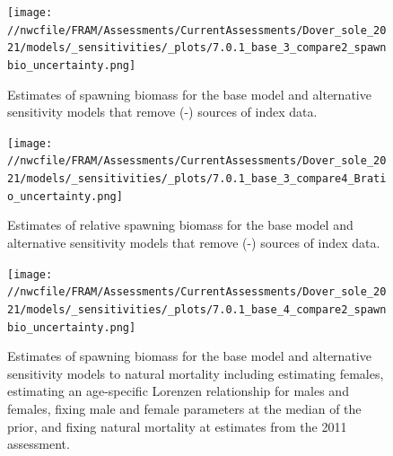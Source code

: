 \documentclass[11pt,
  english,
  a4paper,
]{article}
\begin{document}
\begin{figure}
\centering
\texttt{[image: //nwcfile/FRAM/Assessments/CurrentAssessments/Dover\_sole\_2021/models/\_sensitivities/\_plots/7.0.1\_base\_3\_compare2\_spawnbio\_uncertainty.png]}
\caption{Estimates of spawning biomass for the base model and alternative sensitivity models that remove (-) sources of index data.\label{fig:sens-index-ssb}}
\end{figure}

\tagmcend\tagstructend


\begin{figure}
\centering
\texttt{[image: //nwcfile/FRAM/Assessments/CurrentAssessments/Dover\_sole\_2021/models/\_sensitivities/\_plots/7.0.1\_base\_3\_compare4\_Bratio\_uncertainty.png]}
\caption{Estimates of relative spawning biomass for the base model and alternative sensitivity models that remove (-) sources of index data.\label{fig:sens-index-relssb}}
\end{figure}

\tagmcend\tagstructend


\begin{figure}
\centering
\texttt{[image: //nwcfile/FRAM/Assessments/CurrentAssessments/Dover\_sole\_2021/models/\_sensitivities/\_plots/7.0.1\_base\_4\_compare2\_spawnbio\_uncertainty.png]}
\caption{Estimates of spawning biomass for the base model and alternative sensitivity models to natural mortality including estimating females, estimating an age-specific Lorenzen relationship for males and females, fixing male and female parameters at the median of the prior, and fixing natural mortality at estimates from the 2011 assessment.\label{fig:sens-m-ssb}}
\end{figure}

\tagmcend\tagstructend

\end{document}
